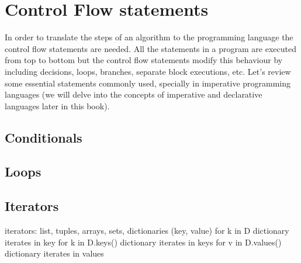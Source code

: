     \section{Control Flow statements}
In order to translate the steps of an algorithm to the programming language the control flow statements are needed. 
All the statements in a program are executed from top to bottom but 
the control flow statements modify this behaviour by including decisions, 
loops, branches, separate block executions, etc. 
Let's review some essential statements commonly used, 
specially in imperative programming languages 
(we will delve into the concepts of imperative and declarative languages later in this book).


        \subsection*{Conditionals}
        
        
        
        \subsection*{Loops}
        
        
        
        \subsection*{Iterators}
        
        iterators: list, tuples, arrays, sets, dictionaries (key, value)
        for k in D   dictionary iterates in key 
        for k in D.keys()   dictionary iterates in keys
        for v in D.values()   dictionary iterates in values
        
    
    
    
    
        


    \newpage 

